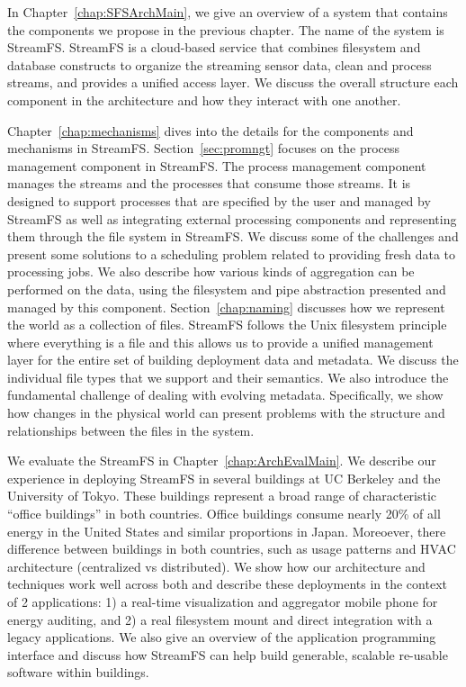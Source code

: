 In Chapter~\ref{chap:SFSArchMain}, we give an overview of a system that contains the components we propose in the previous
chapter.  The name of the system is StreamFS.  StreamFS is a cloud-based service that combines filesystem and database constructs
to organize the streaming sensor data, clean and process streams, and provides a unified access layer.
We discuss the overall structure each component in the architecture and how they interact with one another.

Chapter~\ref{chap:mechanisms} dives into the details for the components and mechanisms in StreamFS.
Section~\ref{sec:promngt} focuses on the process management component in StreamFS.  The process management component
manages the streams and the processes that consume those streams.  It is designed to support processes that are specified by the user
and managed by StreamFS as well as integrating external processing components and representing them through the file system in StreamFS.
We discuss some of the challenges and present some solutions to a scheduling problem related to providing fresh data  to processing jobs.
We also describe how various kinds of aggregation can be performed on the data, using the filesystem and pipe abstraction
presented and managed by this component.
Section~\ref{chap:naming} discusses how we represent the world as a collection of files.  StreamFS follows the Unix filesystem principle 
where everything is a file and this allows us to provide a unified management layer for the entire set of building deployment
data and metadata.  We discuss the individual file types that we support and their semantics.  We also introduce the fundamental
challenge of dealing with evolving metadata.  Specifically,  we show how changes in the physical world can present problems
with the structure and relationships between the files in the system.  

We evaluate the StreamFS in Chapter~\ref{chap:ArchEvalMain}.  We describe our experience in deploying StreamFS in several buildings
at UC Berkeley and the University of Tokyo.  These buildings represent a broad range of characteristic ``office buildings'' in both
countries.  Office buildings consume nearly 20\% of all energy in the United States and similar proportions in Japan.  Moreoever,
there difference between buildings in both countries, such as usage patterns and HVAC architecture (centralized vs distributed).
We show how our architecture and techniques work well across both and describe these deployments in the context of 2 applications: 
1) a real-time visualization and 
aggregator mobile phone for energy auditing, and  2) a real filesystem mount and direct integration with a legacy applications. 
We also give an overview of the application programming interface and discuss how StreamFS can help build generable, scalable 
re-usable software within buildings.

